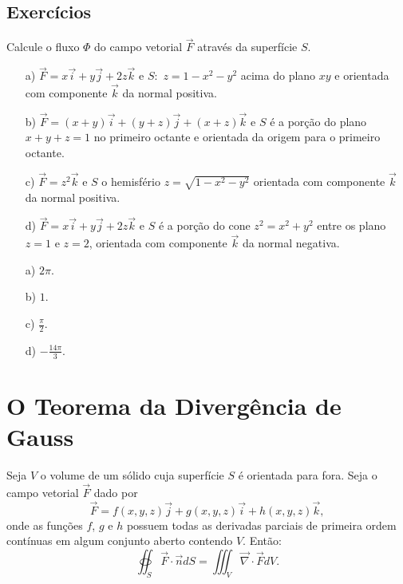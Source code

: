 \subsection*{Exercícios}
\begin{exer}
 Calcule o fluxo $\Phi$ do campo vetorial $\vec{F}$ através da superfície $S$.
 \begin{itemize}
  \item[a)] $\vec{F}=x\vec{i}+y\vec{j}+2z\vec{k}$ e $S:$ $z=1-x^2-y^2$ acima do plano $xy$ e orientada com componente $\vec{k}$ da normal positiva.
  \item[b)] $\vec{F}=(x+y)\vec{i}+(y+z)\vec{j}+(x+z)\vec{k}$ e $S$ é a porção do plano $x+y+z=1$ no primeiro octante e orientada da origem para o primeiro octante.
  \item[c)] $\vec{F}=z^2\vec{k}$ e $S$ o hemisfério $z=\sqrt{1-x^2-y^2}$ orientada com componente $\vec{k}$ da normal positiva.
  \item[d)] $\vec{F}=x\vec{i}+y\vec{j}+2z\vec{k}$ e $S$ é a porção do cone $z^2=x^2+y^2$ entre os plano $z=1$ e $z=2$, orientada com componente $\vec{k}$ da normal negativa.
 \end{itemize}
\end{exer}
\begin{resp}
 \begin{itemize}
  \item[a)] $2\pi$.
  \item[b)] $1$.
  \item[c)] $\frac{\pi}{2}$.
  \item[d)] $-\frac{14\pi}{3}$. 
 \end{itemize}
\end{resp}




\section{O Teorema da Divergência de Gauss}
\begin{teo}
Seja $V$ o volume de um sólido cuja superfície $S$ é orientada para fora. Seja o campo vetorial $\vec{F}$ dado por
$$
\vec{F}=f(x,y,z)\vec{j}+g(x,y,z)\vec{i}+h(x,y,z)\vec{k},
$$
onde as funções $f$, $g$ e $h$ possuem todas as derivadas parciais de primeira ordem contínuas em algum conjunto aberto contendo $V$. Então:
$$
\oiint_S \vec{F}\cdot \vec{n} dS=\iiint_V \vec{\nabla}\cdot \vec{F} dV.
$$
\end{teo}

